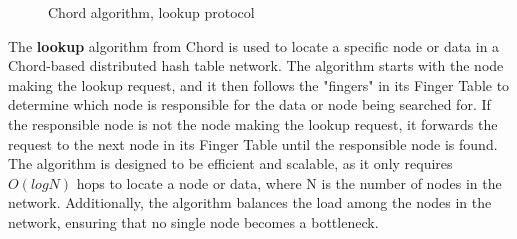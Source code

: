 \documentclass[twocolumn]{article}
\begin{document}
\begin{figure}[h]
      \begin{center}

      \end{center}

      \caption{Chord algorithm, lookup protocol}

    \end{figure}

The \textbf{lookup} algorithm from Chord is used to locate a specific node or data in a Chord-based distributed hash table network. The algorithm starts with the node making the lookup request, and it then follows the "fingers" in its Finger Table to determine which node is responsible for the data or node being searched for. If the responsible node is not the node making the lookup request, it forwards the request to the next node in its Finger Table until the responsible node is found. The algorithm is designed to be efficient and scalable, as it only requires $O(log N)$ hops to locate a node or data, where N is the number of nodes in the network. Additionally, the algorithm balances the load among the nodes in the network, ensuring that no single node becomes a bottleneck.
\end{document}

